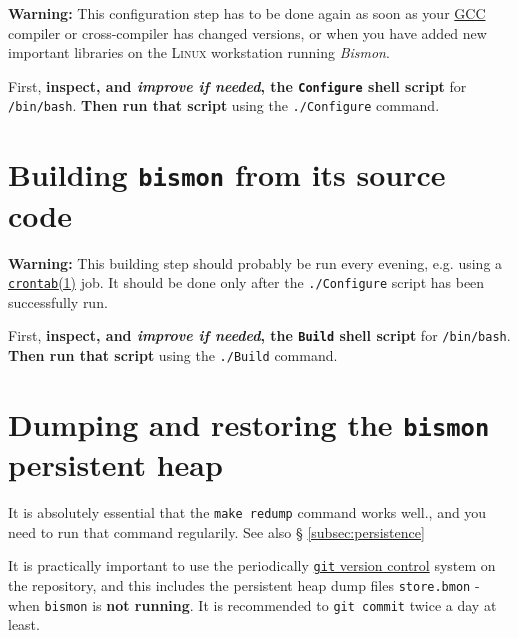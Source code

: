 \begin{appendices}
\textbf{\large Warning:} This configuration step has to be done again as soon
as your \href{http://gcc.gnu.org/}{GCC} compiler or cross-compiler has
changed versions, or when you have added new important libraries on
the \textsc{Linux} workstation running \emph{Bismon}.

First, \textbf{inspect, and \emph{improve if needed}, the \texttt{Configure} shell
script} for \texttt{/bin/bash}. \textbf{Then run that script} using the
\texttt{./Configure} command.

\section{Building \texttt{bismon} from its source code}
\label{sec:building-bismon}

\textbf{\large Warning:} This building step should probably be run
every evening, e.g. using a
\href{https://man7.org/linux/man-pages/man1/crontab.1.html}{\texttt{crontab}(1)}
job. It should be done only after the \texttt{./Configure} script has
been successfully run.

First, \textbf{inspect, and \emph{improve if needed}, the \texttt{Build} shell
script} for \texttt{/bin/bash}. \textbf{Then run that script} using the
\texttt{./Build} command. 


\section{Dumping and restoring the \texttt{bismon} persistent heap}
\label{sec:dumping-restoring-heap}

It is absolutely essential that the \texttt{make redump} command works
well., and you need to run that command regularily.
 See also \S
\ref{subsec:persistence}

It is practically important to use the periodically
\href{http://git-scm.com/}{\texttt{git} version control} system on the
repository, and this includes the persistent heap dump files
\texttt{store\textsection*.bmon} - when \texttt{bismon} is \textbf{not
  running}. It is recommended to \texttt{git commit} twice a day at least.

\end{appendices}
